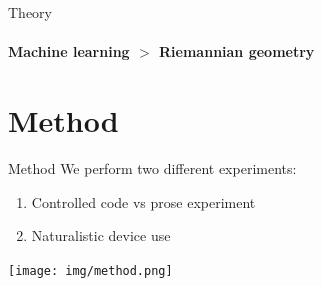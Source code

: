 \documentclass[xcolor={dvipsnames,table},12pt]{beamer}
\begin{document}
\begin{frame}{Theory}
    \framesubtitle{Machine learning $>$ Riemannian geometry}
    {
        \scriptsize
        
    }
\end{frame}

\section{Method}
\begin{frame}{Method}
    We perform two different experiments:

    \begin{enumerate}
        \item Controlled code vs prose experiment
        \item Naturalistic device use
    \end{enumerate}

    \texttt{[image: img/method.png]}
\end{frame}
\end{document}
